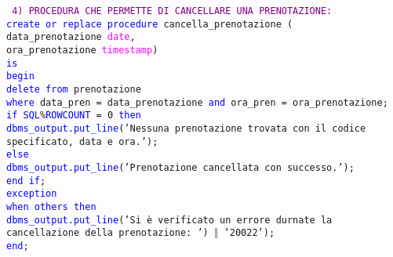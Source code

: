 \documentclass{article}
\begin{document}
    \begin{flushleft}
        \texttt{
        \textcolor{purple}{4) PROCEDURA CHE PERMETTE DI CANCELLARE UNA PRENOTAZIONE:} \\
        \hspace*{2em} \textcolor{blue}{create or replace procedure} cancella\_prenotazione ( \\
        \hspace*{4em}data\_prenotazione \textcolor{magenta}{date}, \\
        \hspace*{4em}ora\_prenotazione \textcolor{magenta}{timestamp}) \\
        \hspace*{2em}\textcolor{blue}{is} \\
        \hspace*{2em}\textcolor{blue}{begin} \\
        \hspace*{4em}\textcolor{blue}{delete from} prenotazione \\
        \hspace*{4em}\textcolor{blue}{where} data\_pren = data\_prenotazione \textcolor{blue}{and} ora\_pren = ora\_prenotazione; \\
        \hspace*{4em}\textcolor{blue}{if SQL}\%\textcolor{blue}{ROWCOUNT} = 0 \textcolor{blue}{then} \\
        \hspace*{6em}\textcolor{blue}{dbms\_output.put\_line}('Nessuna prenotazione trovata con il codice \hspace*{6em}specificato, data e ora.'); \\
        \hspace*{4em}\textcolor{blue}{else} \\
        \hspace*{6em}\textcolor{blue}{dbms\_output.put\_line}('Prenotazione cancellata con successo.'); \\
        \hspace*{4em}\textcolor{blue}{end if}; \\
        \hspace*{2em}\textcolor{blue}{exception} \\
        \hspace*{4em}\textcolor{blue}{when others then} \\
        \hspace*{6em}\textcolor{blue}{dbms\_output.put\_line}('Si è verificato un errore durnate la \hspace*{6em}cancellazione della prenotazione: ') $\Vert$ '20022'); \\
        \hspace*{2em}\textcolor{blue}{end};
        }
    \end{flushleft}
\end{document}
